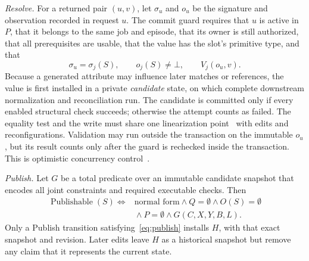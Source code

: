 \documentclass[10pt,journal,compsoc]{IEEEtran}
\theoremstyle{plain}
\theoremstyle{definition}
\newcommand{\Sig}{\sigma}
\newcommand{\Pub}{\operatorname{Publishable}}
\newcommand{\nodata}{\bot}
\begin{document}
\emph{Resolve.} For a returned pair $(u,v)$, let $\Sig_u$ and $o_u$ be the signature and observation recorded in request $u$. The commit guard requires that $u$ is active in $P$, that it belongs to the same job and episode, that its owner is still authorized, that all prerequisites are usable, that the value has the slot's primitive type, and that
\begin{equation}\label{eq:guard}
\Sig_u=\Sig_j(S),\qquad o_j(S)\ne\nodata,\qquad V_j(o_u,v).
\end{equation}
Because a generated attribute may influence later matches or references, the value is first installed in a private \emph{candidate} state, on which complete downstream normalization and reconciliation run. The candidate is committed only if every enabled structural check succeeds; otherwise the attempt counts as failed. The equality test and the write must share one linearization point~\cite{herlihy1990linearizability} with edits and reconfigurations. Validation may run outside the transaction on the immutable $o_u$, but its result counts only after the guard is rechecked inside the transaction. This is optimistic concurrency control~\cite{occ}.

\emph{Publish.} Let $G$ be a total predicate over an immutable candidate snapshot that encodes all joint constraints and required executable checks. Then
\begin{equation}\label{eq:publish}
\begin{split}\Pub(S)\iff{}&\text{normal form}\land Q=\emptyset\land O(S)=\emptyset\\&{}\land P=\emptyset\land G(C,X,Y,B,L).\end{split}
\end{equation}
Only a Publish transition satisfying~\eqref{eq:publish} installs $H$, with that exact snapshot and revision. Later edits leave $H$ as a historical snapshot but remove any claim that it represents the current state.
\end{document}
